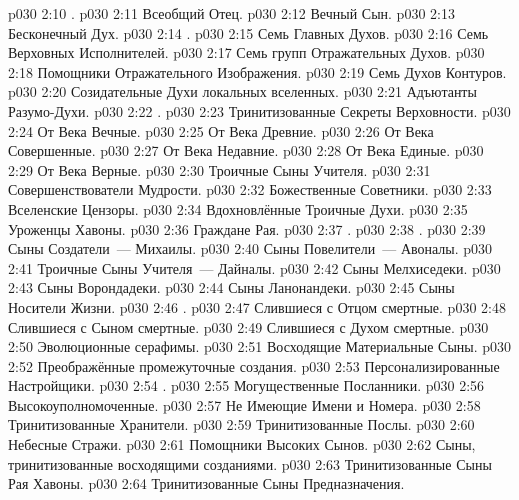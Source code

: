 \vs p030 2:10 .
\vs p030 2:11 Всеобщий Отец.
\vs p030 2:12 Вечный Сын.
\vs p030 2:13 Бесконечный Дух.
\vs p030 2:14 .
\vs p030 2:15 Семь Главных Духов.
\vs p030 2:16 Семь Верховных Исполнителей.
\vs p030 2:17 Семь групп Отражательных Духов.
\vs p030 2:18 Помощники Отражательного Изображения.
\vs p030 2:19 Семь Духов Контуров.
\vs p030 2:20 Созидательные Духи локальных вселенных.
\vs p030 2:21 Адъютанты Разумо\hyp{}Духи.
\vs p030 2:22 .
\vs p030 2:23 Тринитизованные Секреты Верховности.
\vs p030 2:24 От Века Вечные.
\vs p030 2:25 От Века Древние.
\vs p030 2:26 От Века Совершенные.
\vs p030 2:27 От Века Недавние.
\vs p030 2:28 От Века Единые.
\vs p030 2:29 От Века Верные.
\vs p030 2:30 Троичные Сыны Учителя.
\vs p030 2:31 Совершенствователи Мудрости.
\vs p030 2:32 Божественные Советники.
\vs p030 2:33 Вселенские Цензоры.
\vs p030 2:34 Вдохновлённые Троичные Духи.
\vs p030 2:35 Уроженцы Хавоны.
\vs p030 2:36 Граждане Рая.
\vs p030 2:37 .
\vs p030 2:38 .
\vs p030 2:39 Сыны Создатели~--- Михаилы.
\vs p030 2:40 Сыны Повелители~--- Авоналы.
\vs p030 2:41 Троичные Сыны Учителя~--- Дайналы.
\vs p030 2:42 Сыны Мелхиседеки.
\vs p030 2:43 Сыны Ворондадеки.
\vs p030 2:44 Сыны Ланонандеки.
\vs p030 2:45 Сыны Носители Жизни.
\vs p030 2:46 .
\vs p030 2:47 Слившиеся с Отцом смертные.
\vs p030 2:48 Слившиеся с Сыном смертные.
\vs p030 2:49 Слившиеся с Духом смертные.
\vs p030 2:50 Эволюционные серафимы.
\vs p030 2:51 Восходящие Материальные Сыны.
\vs p030 2:52 Преображённые промежуточные создания.
\vs p030 2:53 Персонализированные Настройщики.
\vs p030 2:54 .
\vs p030 2:55 Могущественные Посланники.
\vs p030 2:56 Высокоуполномоченные.
\vs p030 2:57 Не Имеющие Имени и Номера.
\vs p030 2:58 Тринитизованные Хранители.
\vs p030 2:59 Тринитизованные Послы.
\vs p030 2:60 Небесные Стражи.
\vs p030 2:61 Помощники Высоких Сынов.
\vs p030 2:62 Сыны, тринитизованные восходящими созданиями.
\vs p030 2:63 Тринитизованные Сыны Рая Хавоны.
\vs p030 2:64 Тринитизованные Сыны Предназначения.
